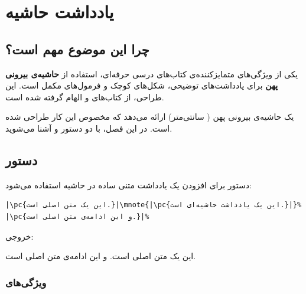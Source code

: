 
\chapter{یادداشت حاشیه}
\label{chap:margin-notes}

\section{چرا این موضوع مهم است؟}
\label{sec:margin-notes-why}

یکی از ویژگی‌های متمایزکننده‌ی کتاب‌های درسی
حرفه‌ای، استفاده از \textbf{حاشیه‌ی بیرونی پهن}
برای یادداشت‌های توضیحی، شکل‌های کوچک و
فرمول‌های مکمل است. این طراحی، از کتاب‌های
 و  الهام گرفته شده
است.

 یک حاشیه‌ی بیرونی پهن (
سانتی‌متر) ارائه می‌دهد که مخصوص این کار طراحی
شده است. در این فصل، با دو دستور 
و  آشنا می‌شوید.


\section{دستور }
\label{sec:margin-notes-mnote}

دستور  برای افزودن یک یادداشت متنی
ساده در حاشیه استفاده می‌شود:

\begin{latin}
\begin{verbatim}
|\pc{این یک متن اصلی است.}|\mnote{|\pc{این یک یادداشت حاشیه‌ای است.}|}%
|\pc{و این ادامه‌ی متن اصلی است.}|%
\end{verbatim}
\end{latin}

خروجی:

این یک متن اصلی است.
و این ادامه‌ی متن اصلی است.


\subsection{ویژگی‌های }
\label{sec:margin-notes-mnote-features}

